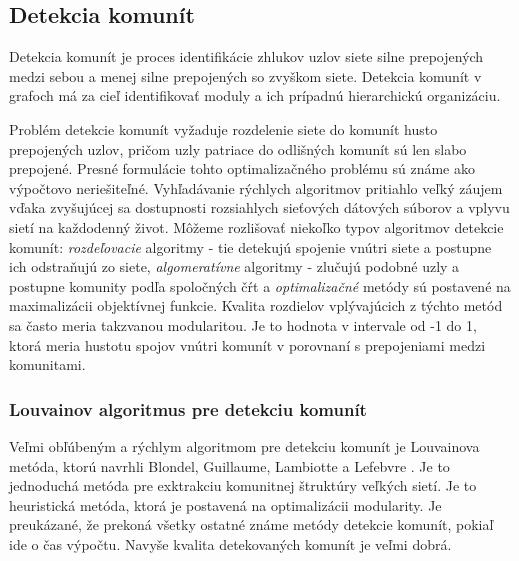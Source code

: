 \documentclass[slovak,master,public,dept460,male,cpdeclaration,oneside]{diploma}
\begin{document}
\subsection{Detekcia komunít}
Detekcia komunít je proces identifikácie zhlukov uzlov siete silne prepojených medzi sebou a menej silne prepojených so zvyškom siete. Detekcia komunít v grafoch má za cieľ identifikovať moduly a ich prípadnú hierarchickú organizáciu.


Problém detekcie komunít vyžaduje  rozdelenie siete do komunít husto prepojených uzlov, pričom uzly patriace do odlišných komunít sú len slabo prepojené. Presné formulácie tohto optimalizačného problému sú známe ako výpočtovo neriešiteľné. Vyhľadávanie rýchlych algoritmov pritiahlo veľký záujem vďaka zvyšujúcej sa dostupnosti rozsiahlych sieťových dátových súborov a vplyvu sietí na každodenný život. Môžeme rozlišovať niekoľko typov algoritmov detekcie komunít: \textit{rozdeľovacie} algoritmy - tie detekujú spojenie vnútri siete a postupne ich odstraňujú zo siete, \textit{algomeratívne} algoritmy - zlučujú podobné uzly a postupne komunity podľa spoločných čŕt a \textit{optimalizačné} metódy sú postavené na maximalizácii objektívnej funkcie. Kvalita rozdielov vplývajúcich z týchto metód sa často meria takzvanou modularitou. Je to hodnota v intervale od -1 do 1, ktorá meria hustotu spojov vnútri komunít v porovnaní s prepojeniami medzi komunitami. 


\subsubsection{Louvainov algoritmus pre detekciu komunít}

Veľmi obľúbeným a rýchlym algoritmom pre detekciu komunít je Louvainova metóda, ktorú navrhli Blondel, Guillaume, Lambiotte a Lefebvre \cite{12}. Je to jednoduchá metóda pre exktrakciu komunitnej štruktúry veľkých sietí. Je to heuristická metóda, ktorá je postavená na optimalizácii modularity. Je preukázané, že prekoná všetky ostatné známe metódy detekcie komunít, pokiaľ ide o čas výpočtu. Navyše kvalita detekovaných komunít je veľmi dobrá.
\end{document}
